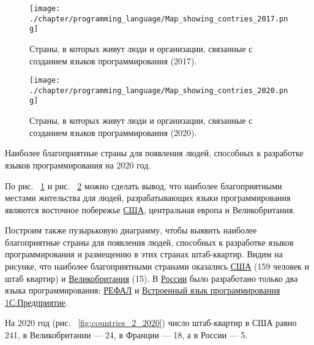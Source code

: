 \begin{figure}[h]
\centering
	\texttt{[image: ./chapter/programming\_language/Map\_showing\_contries\_2017.png]}
	\caption{Страны, в которых живут люди и организации, связанные с созданием языков программирования (2017).}
	\label{fig:countries_2017}
\end{figure}
\begin{figure}
\centering
	\texttt{[image: ./chapter/programming\_language/Map\_showing\_contries\_2020.png]}
	\caption{Страны, в которых живут люди и организации, связанные с созданием языков программирования (2020).}
	\label{fig:countries_2020}
\end{figure}

\pagebreak

\begin{marginfigure}
{
\setlength{\fboxsep}{0pt}%
\setlength{\fboxrule}{1pt}%
}
  \caption{Наиболее благоприятные страны для появления людей, способных к разработке языков программирования на 2020 год.}%
  \label{fig:countries_2_2020}%
\end{marginfigure}
По  рис. ~\ref{fig:countries_2017} и рис. ~\ref{fig:countries_2020} можно сделать вывод, что наиболее благоприятными местами жительства для людей, разрабатывающих языки программирования являются восточное побережье \href{https://en.wikipedia.org/wiki/USA}{США}, центральная европа и Великобритания.

Построим также пузырьковую диаграмму, чтобы выявить наиболее благоприятные страны для появления людей, способных к разработке языков программирования и размещению в этих странах штаб-квартир. Видим на рисунке, что наиболее благоприятными странами оказались \href{https://en.wikipedia.org/wiki/USA}{США} (159 человек и штаб квартир) и \href{https://ru.wikipedia.org/wiki/Великобритания}{Великобритания} (15). В \href{https://en.wikipedia.org/wiki/Russia}{России} было разработано только два языка программирования: \href{https://www.wikidata.org/wiki/Q2626418}{РЕФАЛ} и \href{https://www.wikidata.org/wiki/Q65065977}{Встроенный язык программирования 1С:Предприятие}.

На 2020 год (рис. ~\ref{fig:countries_2_2020}) число штаб-квартир в США равно 241, в Великобритании — 24, в Франции — 18, а в России — 5.

